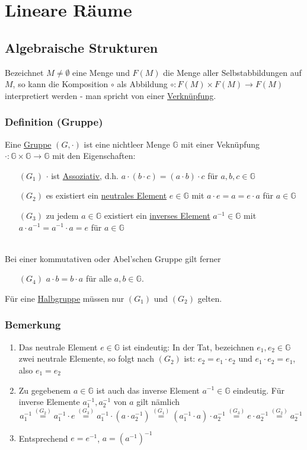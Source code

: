\section{Lineare Räume}
\subsection{Algebraische Strukturen}
Bezeichnet $M\not=\emptyset$ eine Menge und $F(M)$ die Menge aller Selbstabbildungen auf $M$, so kann die Komposition $\circ$ als Abbildung $\circ : F(M)\times F(M) \rightarrow F(M)$ interpretiert werden - man spricht von einer \underline{Verknüpfung}.
\subsubsection{Definition (Gruppe)}
Eine \underline{Gruppe} $(G,\cdot)$ ist eine nichtleer Menge $\mathbb{G}$ mit einer Veknüpfung $\cdot:\mathbb{G}\times\mathbb{G} \rightarrow \mathbb{G}$ mit den Eigenschaften:
\begin{enumerate}
\item[$(G_1)$] $\cdot$ ist \underline{Assoziativ}, d.h. $a\cdot(b\cdot c)=(a\cdot b)\cdot c$ für $a,b,c\in \mathbb{G}$\\
\item[$(G_2)$] es existiert ein \underline{neutrales Element} $e\in\mathbb{G}$ mit $a\cdot e=a=e\cdot a$ für $a\in\mathbb{G}$\\
\item[$(G_3)$] zu jedem $a\in\mathbb{G}$ existiert ein \underline{inverses Element} $a^{-1}\in \mathbb{G}$ mit $a\cdot a^{-1}=a^{-1}\cdot a=e$ für $a\in \mathbb{G}$ \end{enumerate}\\
Bei einer kommutativen oder Abel'schen Gruppe gilt ferner
\begin{enumerate}\item[$(G_4)$] $a\cdot b=b\cdot a$ für alle $a,b\in \mathbb{G}$.\end{enumerate}
Für eine \underline{Halbgruppe} müssen nur $(G_1)$ und $(G_2)$ gelten.
\subsubsection{Bemerkung}
\renewcommand{\labelenumi}{(\arabic{enumi})}
\begin{enumerate}
\item Das neutrale Element $e\in\mathbb{G}$ ist eindeutig: In der Tat, bezeichnen $e_1,e_2\in\mathbb{G}$ zwei neutrale Elemente, so folgt nach $(G_2)$ ist: $e_2=e_1\cdot e_2$ und $e_1\cdot e_2=e_1$, also $e_1=e_2$
\item Zu gegebenem $a\in\mathbb{G}$ ist auch das inverse Element $a^{-1}\in\mathbb{G}$ eindeutig.  Für inverse Elemente $a_1^{-1},a_2^{-1}$ von $a$ gilt nämlich
\[a_1^{-1}\stackrel{(G_2)}{=}a_1^{-1}\cdot e\stackrel{(G_3)}{=}a_1^{-1}\cdot(a\cdot a_2^{-1})\stackrel{(G_1)}{=}(a_1^{-1}\cdot a)\cdot a_2^{-1}\stackrel{(G_3)}{=}e\cdot a_2^{-1}\stackrel{(G_2)}{=}a_2^{-1}\]
\item Entsprechend $e=e^{-1}$, $a=(a^{-1})^{-1}$
\end{enumerate}
